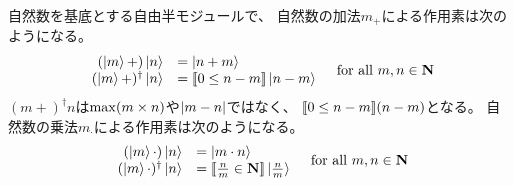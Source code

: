 	\begin{example}[自然数]\label{eg:自然数} %
		自然数を基底とする自由半モジュールで、
		自然数の加法$m_+$による作用素は次のようになる。
		\begin{equation*}\begin{split} %
			\begin{array}{rl}
				(\ket{m}+)\ket{n} &= \ket{n+m} \\
				(\ket{m}+)^\dag\ket{n} &= \jump{0\le n-m}\ket{n-m} \\
			\end{array}
			\quad\text{for all }m,n\in\mybf{N}
		\end{split}\end{equation*} %
		$(m+)^\dag n$は$\operatorname{max}(m\times n)$や$\left|{m-n}\right|$ではなく、
		$[\![0\le n-m]\!](n-m)$となる。
		自然数の乗法$m_\cdot$による作用素は次のようになる。
		\begin{equation*}\begin{split} %
			\begin{array}{rl}
				(\ket{m}\cdot)\ket{n} &= \ket{m\cdot n} \\
				(\ket{m}\cdot)^\dag\ket{n} 
				&= \jump{\frac{n}{m}\in\mybf{N}}\ket{\frac{n}{m}} \\
			\end{array}
			\quad\text{for all }m,n\in\mybf{N}
		\end{split}\end{equation*} %
	\end{example} %

